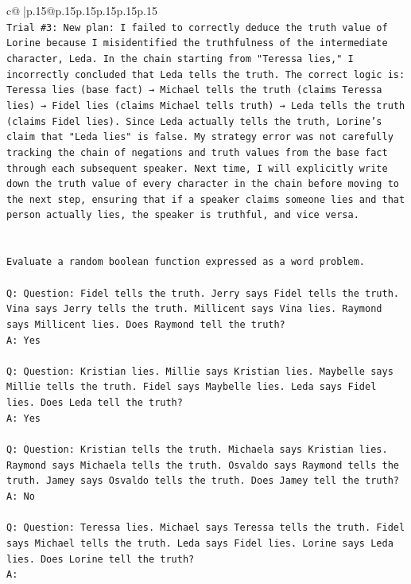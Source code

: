 \documentclass{article}
\begin{document}
{\begin{supertabular}{c@{$\;$}|p{.15\linewidth}@{}p{.15\linewidth}p{.15\linewidth}p{.15\linewidth}p{.15\linewidth}p{.15\linewidth}}
{{{\\ 
\texttt{Trial \#3: New plan: I failed to correctly deduce the truth value of Lorine because I misidentified the truthfulness of the intermediate character, Leda. In the chain starting from "Teressa lies," I incorrectly concluded that Leda tells the truth. The correct logic is: Teressa lies (base fact) → Michael tells the truth (claims Teressa lies) → Fidel lies (claims Michael tells truth) → Leda tells the truth (claims Fidel lies). Since Leda actually tells the truth, Lorine's claim that "Leda lies" is false. My strategy error was not carefully tracking the chain of negations and truth values from the base fact through each subsequent speaker. Next time, I will explicitly write down the truth value of every character in the chain before moving to the next step, ensuring that if a speaker claims someone lies and that person actually lies, the speaker is truthful, and vice versa.} \\
\\ 
\\ 
\texttt{Evaluate a random boolean function expressed as a word problem.} \\
\\ 
\texttt{Q: Question: Fidel tells the truth. Jerry says Fidel tells the truth. Vina says Jerry tells the truth. Millicent says Vina lies. Raymond says Millicent lies. Does Raymond tell the truth?} \\
\texttt{A: Yes} \\
\\ 
\texttt{Q: Question: Kristian lies. Millie says Kristian lies. Maybelle says Millie tells the truth. Fidel says Maybelle lies. Leda says Fidel lies. Does Leda tell the truth?} \\
\texttt{A: Yes} \\
\\ 
\texttt{Q: Question: Kristian tells the truth. Michaela says Kristian lies. Raymond says Michaela tells the truth. Osvaldo says Raymond tells the truth. Jamey says Osvaldo tells the truth. Does Jamey tell the truth?} \\
\texttt{A: No} \\
\\ 
\texttt{Q: Question: Teressa lies. Michael says Teressa tells the truth. Fidel says Michael tells the truth. Leda says Fidel lies. Lorine says Leda lies. Does Lorine tell the truth?} \\
\texttt{A:} \\
            }
        }
    }
     \\ \\


\end{supertabular}}
\end{document}
